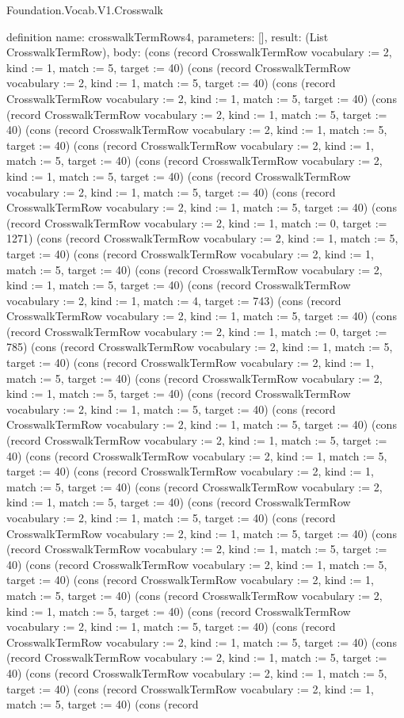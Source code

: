 \begin{lexlean}{Foundation.Vocab.V1.Crosswalk}
\begin{semanticmodule}
definition{
  name: crosswalkTermRows4,
  parameters: [],
  result: (List CrosswalkTermRow),
  body: (cons (record CrosswalkTermRow {vocabulary := 2, kind := 1, match := 5, target := 40}) (cons (record CrosswalkTermRow {vocabulary := 2, kind := 1, match := 5, target := 40}) (cons (record CrosswalkTermRow {vocabulary := 2, kind := 1, match := 5, target := 40}) (cons (record CrosswalkTermRow {vocabulary := 2, kind := 1, match := 5, target := 40}) (cons (record CrosswalkTermRow {vocabulary := 2, kind := 1, match := 5, target := 40}) (cons (record CrosswalkTermRow {vocabulary := 2, kind := 1, match := 5, target := 40}) (cons (record CrosswalkTermRow {vocabulary := 2, kind := 1, match := 5, target := 40}) (cons (record CrosswalkTermRow {vocabulary := 2, kind := 1, match := 5, target := 40}) (cons (record CrosswalkTermRow {vocabulary := 2, kind := 1, match := 5, target := 40}) (cons (record CrosswalkTermRow {vocabulary := 2, kind := 1, match := 0, target := 1271}) (cons (record CrosswalkTermRow {vocabulary := 2, kind := 1, match := 5, target := 40}) (cons (record CrosswalkTermRow {vocabulary := 2, kind := 1, match := 5, target := 40}) (cons (record CrosswalkTermRow {vocabulary := 2, kind := 1, match := 5, target := 40}) (cons (record CrosswalkTermRow {vocabulary := 2, kind := 1, match := 4, target := 743}) (cons (record CrosswalkTermRow {vocabulary := 2, kind := 1, match := 5, target := 40}) (cons (record CrosswalkTermRow {vocabulary := 2, kind := 1, match := 0, target := 785}) (cons (record CrosswalkTermRow {vocabulary := 2, kind := 1, match := 5, target := 40}) (cons (record CrosswalkTermRow {vocabulary := 2, kind := 1, match := 5, target := 40}) (cons (record CrosswalkTermRow {vocabulary := 2, kind := 1, match := 5, target := 40}) (cons (record CrosswalkTermRow {vocabulary := 2, kind := 1, match := 5, target := 40}) (cons (record CrosswalkTermRow {vocabulary := 2, kind := 1, match := 5, target := 40}) (cons (record CrosswalkTermRow {vocabulary := 2, kind := 1, match := 5, target := 40}) (cons (record CrosswalkTermRow {vocabulary := 2, kind := 1, match := 5, target := 40}) (cons (record CrosswalkTermRow {vocabulary := 2, kind := 1, match := 5, target := 40}) (cons (record CrosswalkTermRow {vocabulary := 2, kind := 1, match := 5, target := 40}) (cons (record CrosswalkTermRow {vocabulary := 2, kind := 1, match := 5, target := 40}) (cons (record CrosswalkTermRow {vocabulary := 2, kind := 1, match := 5, target := 40}) (cons (record CrosswalkTermRow {vocabulary := 2, kind := 1, match := 5, target := 40}) (cons (record CrosswalkTermRow {vocabulary := 2, kind := 1, match := 5, target := 40}) (cons (record CrosswalkTermRow {vocabulary := 2, kind := 1, match := 5, target := 40}) (cons (record CrosswalkTermRow {vocabulary := 2, kind := 1, match := 5, target := 40}) (cons (record CrosswalkTermRow {vocabulary := 2, kind := 1, match := 5, target := 40}) (cons (record CrosswalkTermRow {vocabulary := 2, kind := 1, match := 5, target := 40}) (cons (record CrosswalkTermRow {vocabulary := 2, kind := 1, match := 5, target := 40}) (cons (record CrosswalkTermRow {vocabulary := 2, kind := 1, match := 5, target := 40}) (cons (record CrosswalkTermRow {vocabulary := 2, kind := 1, match := 5, target := 40}) (cons (record }
\end{semanticmodule}
\end{lexlean}
